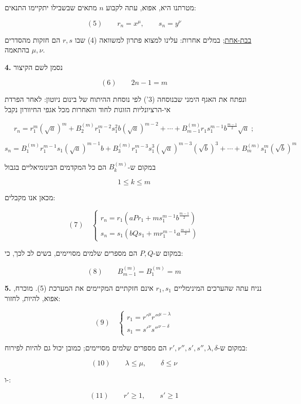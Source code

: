 מטרתנו היא, אפוא, עתה לקבוע $n$ מתאים שבשבילו יתקיימו התנאים:

\[ (5) \qquad r_n = x^{\mu} , \qquad s_n = y^{\nu} \]

\underline{בבת-אחת}; במלים אחרות: עלינו למצוא פתרון למשוואה (4) שבו
$r, s$ הם חזקות מהסדרים $\mu, \nu$ בהתאמה.

\noindent\textbf{4.} נסמן לשם הקיצור

\[ (6) \qquad 2n - 1 = m \]

ונפתח את האגף הימני שבנוסחה (3') לפי נוסחת ההיתוח של בינום ניוטון:
לאחר הפרדת אי-הרציונליות הזוגות לחוד והאחרות מכל אגפי החיוורון נקבל

\[ r_n = r_1^{m}(\sqrt{a})^m + B_2^{(m)} r_1^{m-2} s_1^2 b(\sqrt{a})^{m-2} + \cdots
+ B_{m-1}^{(m)} r_1 s_1^{m-1} b^{\frac{m-1}{2}}\sqrt{a} \; ; \]

\[ s_n = B_1^{(m)} r_1^{m-1} s_1(\sqrt{a})^{m-1} b + B_3^{(m)} r_1^{m-3} s_1^3(\sqrt{a})^{m-3}(\sqrt{b})^3
+ \cdots + B_m^{(m)} s_1^m(\sqrt{b})^m \]

במקום ש-$B_k^{(m)}$ הם כל המקדמים הבינומיאליים בגבול

\[ 1 \leq k \leq m \]

\noindent מכאן אנו מקבלים:

\[ (7) \quad
\begin{cases}
r_n = r_1\left(aPr_1 + m s_1^{m-1} b^{\frac{m-1}{2}}\right) \\[4pt]
s_n = s_1\left(bQs_1 + m r_1^{m-1} a^{\frac{m-1}{2}}\right)
\end{cases}
\]

במקום ש-$P, Q$ הם מספרים שלמים מסויימים, בשים לב לכך, כי:

\[ (8) \qquad B_{m-1}^{(m)} = B_1^{(m)} = m \]

\noindent\textbf{5.} נניח עתה שהערכים המינימליים $r_1, s_1$ אינם חזקתיים המקיימים
את המערכת (5). מוכרח, אפוא, להיות, לחזור:

\[ (9) \quad
\begin{cases}
r_1 = r'^{\mu} r''^{\mu - \lambda} \\
s_1 = s'^{\nu} s''^{\nu - \delta}
\end{cases}
\]

במקום ש-$r', r'', s', s'', \lambda, \delta$ הם מספרים שלמים מסויימים;
כמובן יכול גם להיות לפירוח: %

\[ (10) \qquad \lambda \leq \mu , \qquad \delta \leq \nu \]

ו-:

\[ (11) \qquad r' \geq 1 , \qquad s' \geq 1 \]

